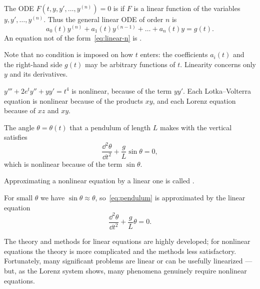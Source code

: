 \begin{definition}
	The ODE \(F(t, y, y', \dots, y^{(n)}) = 0\) is  if \(F\) is a linear
	function of the variables \(y, y', \dots, y^{(n)}\). Thus the general linear ODE of
	order \(n\) is
	\begin{equation}\label{eq:linear-n}
		a_0(t) y^{(n)} + a_1(t) y^{(n-1)} + \dots + a_n(t) y = g(t).
	\end{equation}
	An equation not of the form~\eqref{eq:linear-n} is .
\end{definition}

\begin{remark}
	Note that no condition is imposed on how \(t\) enters: the coefficients \(a_i(t)\) and
	the right-hand side \(g(t)\) may be arbitrary functions of \(t\). Linearity concerns
	only \(y\) and its derivatives.
\end{remark}

\begin{eg}
	\(y''' + 2e^t y'' + yy' = t^4\) is nonlinear, because of the term \(yy'\). Each
	Lotka--Volterra equation is nonlinear because of the products \(xy\), and each Lorenz
	equation because of \(xz\) and \(xy\).
\end{eg}

\begin{eg}
	The angle \(\theta = \theta(t)\) that a pendulum of length \(L\) makes with the
	vertical satisfies
	\begin{equation}\label{eq:pendulum}
		\frac{\dd^2 \theta}{\dd t^2} + \frac{g}{L} \sin\theta = 0,
	\end{equation}
	which is nonlinear because of the term \(\sin\theta\).
\end{eg}

\begin{definition}[Linearization]
	Approximating a nonlinear equation by a linear one is called .
\end{definition}

\begin{eg}
	For small \(\theta\) we have \(\sin\theta \approx \theta\), so~\eqref{eq:pendulum}
	is approximated by the linear equation
	\[
		\frac{\dd^2\theta}{\dd t^2} + \frac{g}{L}\theta = 0.
	\]
\end{eg}

\begin{moral}
	The theory and methods for linear equations are highly developed; for nonlinear
	equations the theory is more complicated and the methods less satisfactory.
	Fortunately, many significant problems are linear or can be usefully linearized ---
	but, as the Lorenz system shows, many phenomena genuinely require nonlinear equations.
\end{moral}

